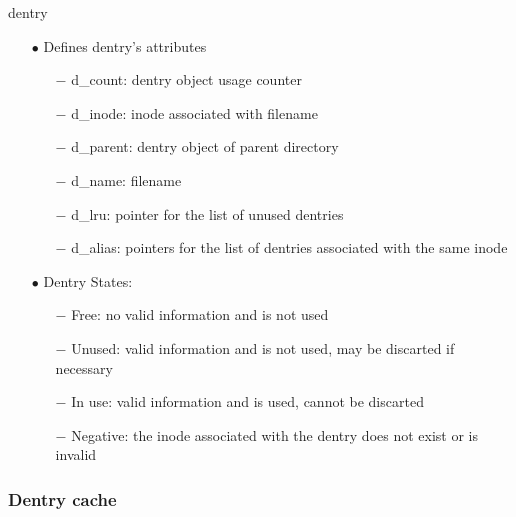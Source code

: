 \documentclass{beamer}
\begin{document}
\begin{frame}{dentry}

	\begin{itemize}[<+->]
		\item[$\bullet$]{Defines dentry's attributes}
			\begin{itemize}
				\item[$-$]{d\_count: dentry object usage counter}
				\item[$-$]{d\_inode: inode associated with filename}
				\item[$-$]{d\_parent: dentry object of parent directory}
				\item[$-$]{d\_name: filename}
				\item[$-$]{d\_lru: pointer for the list of unused dentries}
				\item[$-$]{d\_alias: pointers for the list of dentries associated with the same inode}
			\end{itemize}

		\item[$\bullet$]{Dentry States:}
			\begin{itemize}
				\item[$-$]{Free: no valid information and is not used}
				\item[$-$]{Unused: valid information and is not used, may be discarted if necessary}
				\item[$-$]{In use: valid information and is used, cannot be discarted}
				\item[$-$]{Negative: the inode associated with the dentry does not exist or is invalid}
			\end{itemize}
	\end{itemize}

\end{frame}


\subsubsection{Dentry cache}
\end{document}
